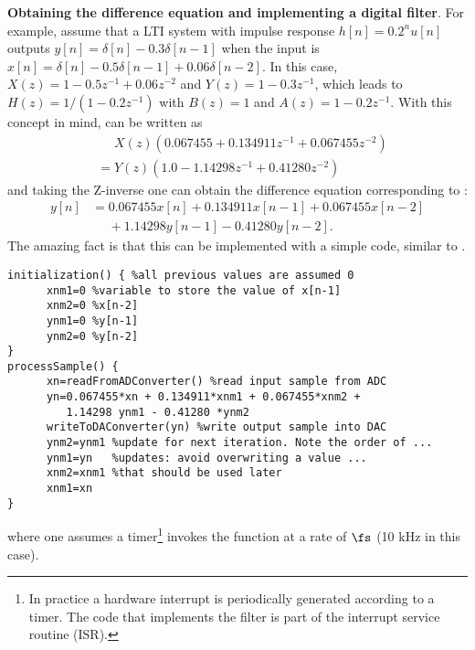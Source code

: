\bExample \textbf{Obtaining the difference equation and implementing a digital filter}.
For example, assume that a LTI system with impulse response $h[n]=0.2^n u[n]$ outputs $y[n]=\delta[n] - 0.3\delta[n-1]$ when the input is $x[n]=\delta[n] - 0.5\delta[n-1] + 0.06\delta[n-2]$. In this case, $X(z)=1 -0.5z^{-1} + 0.06z^{-2}$ and $Y(z)=1-0.3z^{-1}$, which leads to $H(z)=1/(1-0.2z^{-1})$ with $B(z)=1$ and $A(z)=1-0.2z^{-1}$. With this concept in mind,  can be written as
\begin{align*}
&\mathrel{\phantom{=}}X(z) (0.067455  + 0.134911  z^{-1} + 0.067455 z^{-2})\\
&= Y(z) (1.0  -1.14298 z^{-1}  + 0.41280 z^{-2})
\end{align*}
and taking the Z-inverse one can obtain the difference equation corresponding to :
\begin{align*} %
y[n]&=0.067455x[n] + 0.134911x[n-1] + 0.067455x[n-2] \\
&\mathrel{\phantom{=}} + 1.14298 y[n-1] - 0.41280 y[n-2].
\end{align*}
The amazing fact is that this can be implemented with a simple code, similar to .

\begin{lstlisting}[caption=Digital filter implementation in pseudo-code.,label={code:digitalfilter}]
initialization() { %all previous values are assumed 0
	  xnm1=0 %variable to store the value of x[n-1]
	  xnm2=0 %x[n-2]
	  ynm1=0 %y[n-1]
	  ynm2=0 %y[n-2]
}
processSample() {
	  xn=readFromADConverter() %read input sample from ADC
	  yn=0.067455*xn + 0.134911*xnm1 + 0.067455*xnm2 + 
	  	 1.14298 ynm1 - 0.41280 *ynm2
	  writeToDAConverter(yn) %write output sample into DAC
	  ynm2=ynm1 %update for next iteration. Note the order of ...
	  ynm1=yn   %updates: avoid overwriting a value ...
	  xnm2=xnm1 %that should be used later
	  xnm1=xn
}
\end{lstlisting}
where one assumes a timer\footnote{In practice a hardware interrupt is periodically generated according to a timer. The code that implements the filter is part of the interrupt service routine (ISR).} invokes the function  at a rate of $\fs$ (10 kHz in this case). 


